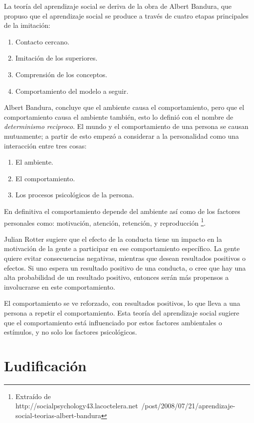 La teoría del aprendizaje social se deriva de la obra de Albert Bandura, que
propuso que el aprendizaje social se produce a través de cuatro etapas
principales de la imitación:

\begin{enumerate}
\item Contacto cercano.
\item Imitación de los superiores.
\item Comprensión de los conceptos.
\item Comportamiento del modelo a seguir.
\end{enumerate}

Albert Bandura, concluye que el ambiente causa el comportamiento, pero que el
comportamiento causa el ambiente también, esto lo definió con el nombre de
\emph{determinismo reciproco}. El mundo y el comportamiento de una persona se
causan mutuamente; a partir de esto empezó a considerar a la personalidad como
una interacción entre tres cosas:

\begin{enumerate}
\item El ambiente.
\item El comportamiento.
\item Los procesos psicológicos de la persona.
\end{enumerate}

En definitiva el comportamiento depende del ambiente así como de los factores
personales como: motivación, atención, retención, y reproducción
\footnote{Extraído de http://socialpsychology43.lacoctelera.net\
/post/2008/07/21/aprendizaje-social-teorias-albert-bandura}.

Julian Rotter sugiere que el efecto de la conducta tiene un impacto en la
motivación de la gente a participar en ese comportamiento específico. La gente
quiere evitar consecuencias negativas, mientras que desean resultados positivos
o efectos. Si uno espera un resultado positivo de una conducta, o cree que hay
una alta probabilidad de un resultado positivo, entonces serán más propensos a
involucrarse en este comportamiento.

El comportamiento se ve reforzado, con resultados positivos, lo que lleva a una
persona a repetir el comportamiento. Esta teoría del aprendizaje social sugiere
que el comportamiento está influenciado por estos factores ambientales o
estímulos, y no solo los factores psicológicos.

\section{Ludificación}

